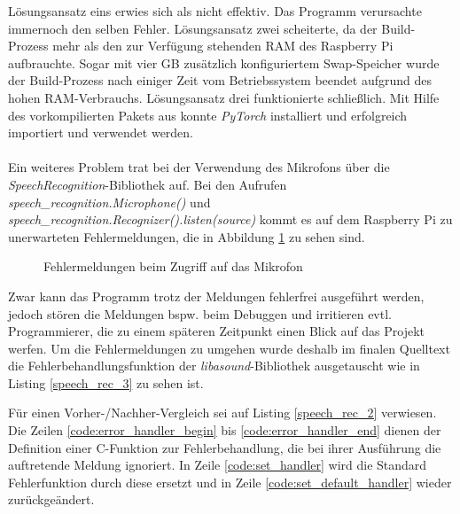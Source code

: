 Lösungsansatz eins erwies sich als nicht effektiv. Das Programm verursachte immernoch den selben Fehler. Lösungsansatz zwei scheiterte, da der Build-Prozess mehr als den zur Verfügung stehenden \ac{RAM} des Raspberry Pi aufbrauchte. Sogar mit vier \ac{GB} zusätzlich konfiguriertem Swap-Speicher wurde der Build-Prozess nach einiger Zeit vom Betriebssystem beendet aufgrund des hohen \ac{RAM}-Verbrauchs. Lösungsansatz drei funktionierte schließlich. Mit Hilfe des vorkompilierten Pakets aus \cite{q-engineering_install_nodate} konnte \textit{PyTorch} installiert und erfolgreich importiert und verwendet werden.\\\\
Ein weiteres Problem trat bei der Verwendung des Mikrofons über die \textit{SpeechRecognition}-Bibliothek auf. Bei den Aufrufen \textit{speech\_recognition.Microphone()} und\\ \textit{speech\_recognition.Recognizer().listen(source)} kommt es auf dem Raspberry Pi zu unerwarteten Fehlermeldungen, die in Abbildung \ref{img:alsa_errors} zu sehen sind.
\begin{figure}[H]
    \centering
    \caption{Fehlermeldungen beim Zugriff auf das Mikrofon}
    \label{img:alsa_errors}
\end{figure}
\noindent
Zwar kann das Programm trotz der Meldungen fehlerfrei ausgeführt werden, jedoch stören die Meldungen bspw. beim Debuggen und irritieren evtl. Programmierer, die zu einem späteren Zeitpunkt einen Blick auf das Projekt werfen. Um die Fehlermeldungen zu umgehen wurde deshalb im finalen Quelltext die Fehlerbehandlungsfunktion der \textit{libasound}-Bibliothek ausgetauscht wie in Listing \ref{speech_rec_3} zu sehen ist.

Für einen Vorher-/Nachher-Vergleich sei auf Listing \ref{speech_rec_2} verwiesen. Die Zeilen \ref{code:error_handler_begin} bis \ref{code:error_handler_end} dienen der Definition einer C-Funktion zur Fehlerbehandlung, die bei ihrer Ausführung die auftretende Meldung ignoriert. In Zeile \ref{code:set_handler} wird die Standard Fehlerfunktion durch diese ersetzt und in Zeile \ref{code:set_default_handler} wieder zurückgeändert. 
